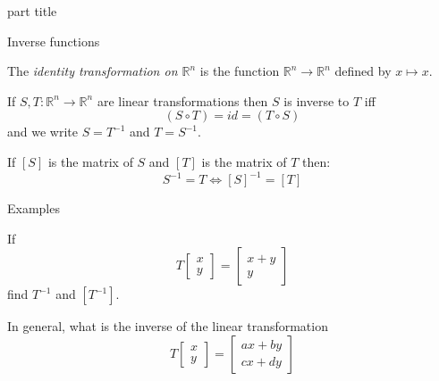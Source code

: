 \documentclass{beamer}
\begin{document}
\begin{frame}
\begin{beamercolorbox}[sep=12pt,center]{part title}
\insertsection\par
\end{beamercolorbox}
\end{frame}

\begin{frame}{Inverse functions}
\begin{definition}
The \emph{identity transformation on $\mathbb{R}^n$} is the function $\mathbb{R}^n \rightarrow \mathbb{R}^n$ defined by $x\mapsto x$.
\end{definition}
\begin{definition}
If $S,T:\mathbb{R}^n \rightarrow \mathbb{R}^n$ are linear transformations then $S$ is inverse to $T$ iff 
\begin{equation*}
(S\circ T) = id = (T\circ S)
\end{equation*}
and we write $S = T^{-1}$ and $T = S^{-1}$.
\end{definition}
\begin{theorem}
If $[S]$ is the matrix of $S$ and $[T]$ is the matrix of $T$ then:
\begin{equation*}
S^{-1} = T \iff [S]^{-1} = [T]
\end{equation*}
\end{theorem}
\end{frame}

\begin{frame}{Examples}
\begin{example}
If
\begin{equation*}
T \left[
\begin{array}{c}
x\\
y
\end{array}
\right] = \left[
\begin{array}{c}
x+y\\
y
\end{array}
\right]
\end{equation*}
find $T^{-1}$ and $[T^{-1}]$.
\end{example}
\begin{example}
In general, what is the inverse of the linear transformation
\begin{equation*}
T \left[
\begin{array}{c}
x\\
y
\end{array}
\right] = \left[
\begin{array}{c}
ax +by\\
cx+dy
\end{array}
\right]
\end{equation*}
\end{example}
\end{frame}
\end{document}

